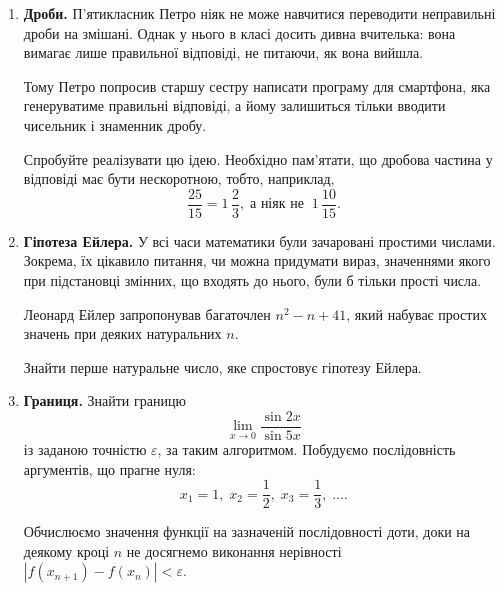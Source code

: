 \begin{enumerate}
\item \textbf{Дроби.} П'ятикласник Петро ніяк не може навчитися переводити неправильні дроби на змішані. Однак у нього в класі досить дивна вчителька: вона вимагає лише правильної відповіді, не питаючи, як вона вийшла.

Тому Петро попросив старшу сестру написати програму для смартфона, яка генеруватиме правильні відповіді, а йому залишиться тільки вводити чисельник і знаменник дробу.

Спробуйте реалізувати цю ідею. Необхідно пам'ятати, що дробова частина у відповіді має бути нескоротною, тобто, наприклад,
$$
\frac{25}{15}=1\,\frac{2}{3}, \;\text{а ніяк не} \; \; 1\,\frac{10}{15}.
$$
\item \textbf{Гіпотеза Ейлера.} У всі часи математики були зачаровані простими числами. Зокрема, їх цікавило питання, чи можна придумати вираз, значеннями якого при підстановці змінних, що входять до нього, були б тільки прості числа.

Леонард Ейлер запропонував багаточлен $n^2-n+41$, який набуває простих значень при деяких натуральних $n$.

Знайти перше натуральне число, яке спростовує гіпотезу Ейлера.

 

\item \textbf{Границя.} Знайти границю
$$
\lim_{x\to 0}\frac{\sin 2x}{\sin 5x}
$$
із заданою точністю $\varepsilon$, за таким алгоритмом. Побудуємо послідовність аргументів, що прагне нуля:
$$
x_1 = 1, \; x_2=\frac{1}{2}, \; x_3=\frac{1}{3}, \;\ldots.
$$

Обчислюємо значення функції на зазначеній послідовності доти, доки на деякому кроці $n$ не досягнемо виконання нерівності
$\left|f(x_{n+1})-f(x_n)\right|<\varepsilon$.
\end{enumerate}




